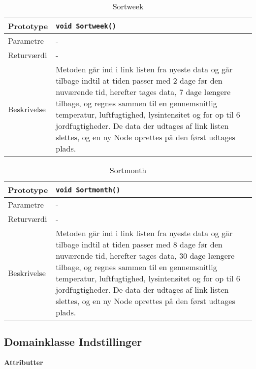 \begin{table}[h]
\begin{tabularx}{\textwidth}{| >{\raggedright\arraybackslash}p{2.5 cm} | >{\raggedright\arraybackslash}X |} \hline
Prototype & \texttt{void Sortweek()} \\\hline
Parametre & - \\\hline
Returværdi & - \\\hline
Beskrivelse & Metoden går ind i link listen fra nyeste data og går tilbage indtil at tiden passer med 2 dage før den nuværende tid, herefter tages data, 7 dage længere tilbage, og regnes sammen til en gennemsnitlig temperatur, luftfugtighed, lysintensitet og for op til 6 jordfugtigheder. De data der udtages af link listen slettes, og en ny Node oprettes på den først udtages plads. \\\hline
\end{tabularx}
\caption{Sortweek}
\label{table:Sortweek}
\end{table}

\begin{table}[h]
\begin{tabularx}{\textwidth}{| >{\raggedright\arraybackslash}p{2.5 cm} | >{\raggedright\arraybackslash}X |} \hline
Prototype & \texttt{void Sortmonth()} \\\hline
Parametre & - \\\hline
Returværdi & - \\\hline
Beskrivelse & Metoden går ind i link listen fra nyeste data og går tilbage indtil at tiden passer med 8 dage før den nuværende tid, herefter tages data, 30 dage længere tilbage, og regnes sammen til en gennemsnitlig temperatur, luftfugtighed, lysintensitet og for op til 6 jordfugtigheder. De data der udtages af link listen slettes, og en ny Node oprettes på den først udtages plads. \\\hline
\end{tabularx}
\caption{Sortmonth}
\label{table:Sortmonth}
\end{table}


\clearpage

\subsection{Domainklasse Indstillinger}

\textbf{Attributter}

